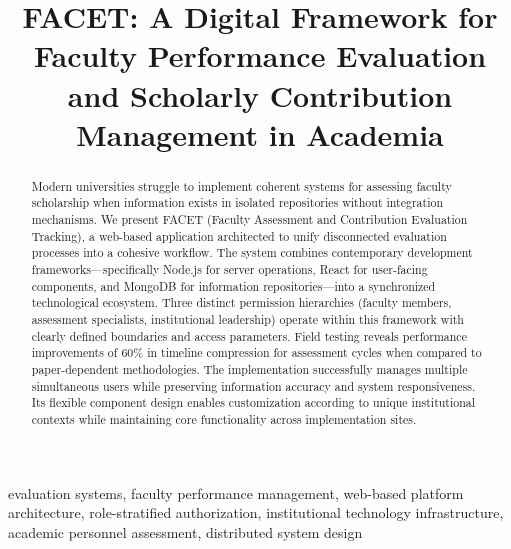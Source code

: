 \documentclass[conference]{IEEEtran}
\title{FACET: A Digital Framework for Faculty Performance Evaluation and Scholarly Contribution Management in Academia}
\author{
\IEEEauthorblockN{Author Name}
\IEEEauthorblockA{\textit{Department/Institution} \\
\textit{University/Organization Name} \\
\textit{Email: author@institution.edu}}
}
\begin{document}
\maketitle

\begin{abstract}
Modern universities struggle to implement coherent systems for assessing faculty scholarship when information exists in isolated repositories without integration mechanisms. We present FACET (Faculty Assessment and Contribution Evaluation Tracking), a web-based application architected to unify disconnected evaluation processes into a cohesive workflow. The system combines contemporary development frameworks---specifically Node.js for server operations, React for user-facing components, and MongoDB for information repositories---into a synchronized technological ecosystem. Three distinct permission hierarchies (faculty members, assessment specialists, institutional leadership) operate within this framework with clearly defined boundaries and access parameters. Field testing reveals performance improvements of 60\% in timeline compression for assessment cycles when compared to paper-dependent methodologies. The implementation successfully manages multiple simultaneous users while preserving information accuracy and system responsiveness. Its flexible component design enables customization according to unique institutional contexts while maintaining core functionality across implementation sites.
\end{abstract}

\begin{IEEEkeywords}
evaluation systems, faculty performance management, web-based platform architecture, role-stratified authorization, institutional technology infrastructure, academic personnel assessment, distributed system design
\end{IEEEkeywords}
\end{document}
